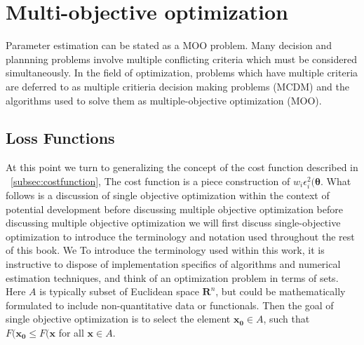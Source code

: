 \section{Multi-objective optimization}

Parameter estimation can be stated as a MOO problem.
Many decision and plannning problems involve multiple conflicting criteria which must be considered simultaneously.
In the field of optimization, problems which have multiple criteria are deferred to as multiple critieria decision making problems (MCDM) and the algorithms used to solve them as multiple-objective optimization (MOO).

\subsection{Loss Functions}
\label{subsec:lossfunctions}

At this point we turn to generalizing the concept of the cost function described in ~\ref{subsec:costfunction}, The cost function is a piece construction of $w_i \epsilon_i^2(\bm{\theta}$.
What follows is a discussion of single objective optimization within the context of potential development before discussing multiple objective optimization  before discussing multiple objective optimization we will first discuss single-objective optimization to introduce the terminology and notation used throughout the rest of this book.
We
To introduce the terminology used within this work, it is instructive to dispose of implementation specifics of algorithms and numerical estimation techniques, and think of an optimization problem in terms of sets.
Here $A$ is typically subset of Euclidean space $\bm{R}^n$, but could be mathematically formulated to include non-quantitative data or functionals.
Then the goal of single objective optimization is to select the element $\bm{x_0} \in A$, such that $F(\bm{x_0} \leq F(\bm{x}$ for all $\bm{x} \in A$.

